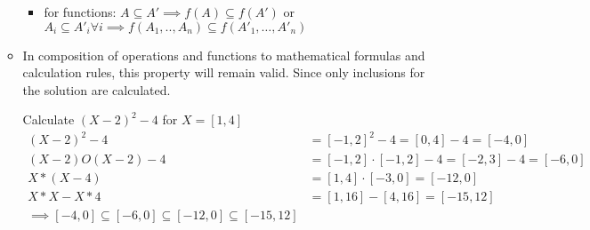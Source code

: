 \begin{itemize}
\begin{itemize}
\begin{itemize}
			\item for functions: $A\subseteq A' \implies f(A)\subseteq f(A')$ or $A_i\subseteq A'_i \forall i \implies f(A_1,..,A_n)\subseteq f(A'_1,\dots,A'_n)$
		\end{itemize}
	\item In composition of operations and functions to mathematical formulas and calculation rules, this property will remain valid. Since only inclusions for the solution are calculated.
	\begin{*example} Calculate $(X-2)^2-4$ for $X=[1,4]$
		\begin{align*} %
			(X-2)^2-4&=[-1,2]^2-4=[0,4]-4=[-4,0]\\
			(X-2) O (X-2)-4&=[-1,2]\cdot[-1,2]-4=[-2,3]-4=[-6,0]\\
			X*(X-4)&=[1,4]\cdot[-3,0]=[-12,0]\\
			X*X-X*4&=[1,16]-[4,16]=[-15,12]\\
			\implies [-4,0]\subseteq [-6,0] \subseteq [-12,0] \subseteq [-15,12]
		\end{align*}
	\end{*example}
	\end{itemize}
\end{itemize} 
%
